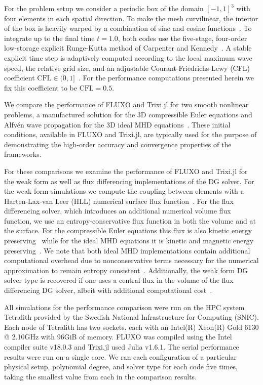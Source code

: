 \documentclass{juliacon}
\newcommand{\trixi}{Trixi.jl\xspace}
\begin{document}
For the problem setup we consider a periodic box of the domain $[-1,1]^3$ with four elements in each
spatial direction. To make the mesh curvilinear, the interior of the box is heavily warped
by a combination of sine and cosine functions~\cite{chan2019efficient}. To integrate up to the
final time $t=1.0$, both codes use the five-stage, four-order low-storage explicit
Runge-Kutta method of Carpenter and Kennedy~\cite{CarpenterKennedy1994}.
A stable explicit time step is adaptively computed according to the local maximum wave
speed, the relative grid size, and an adjustable Courant-Friedrichs-Lewy (CFL)
coefficient $\text{CFL}\in(0,1]$~\cite{gassner2011}. For the performance computations presented herein
we fix this coefficient to be $\text{CFL}=0.5$.

We compare the performance of FLUXO and \trixi for two smooth nonlinear problems,
a manufactured solution for the 3D compressible Euler equations and Alfv\'{e}n wave propagation for
the 3D ideal MHD equations~\cite{gassner2009,altmann2012}. These initial conditions, available in FLUXO and
\trixi, are typically used for the purpose of demonstrating the high-order accuracy and convergence properties
of the frameworks.

For these comparisons we examine the performance of FLUXO and \trixi for the weak
form as well as flux differencing implementations of the DG solver. For the weak form simulations we compute
the coupling between elements with a Harten-Lax-van Leer (HLL) numerical surface flux function~\cite{Toro2009,li2005hllc}.
For the flux differencing solver, which introduces an additional numerical volume flux function, we use an entropy-conservative flux
function in both the volume and at the surface. For the compressible Euler equations
this flux is also kinetic energy preserving~\cite{ranocha2020icosahom, ranocha2018thesis}
while for the ideal MHD equations it is kinetic and magnetic energy preserving~\cite{hindenlang2019}. We note that both ideal MHD implementations
contain additional computational overhead due to nonconservative terms necessary for the numerical approximation
to remain entropy consistent~\cite{bohm2020}. Additionally, the weak form DG solver type is recovered if one uses a central flux
in the volume of the flux differencing DG solver, albeit with additional computational cost~\cite{gassner2016split}.

All simulations for the performance comparison were run on the HPC system Tetralith
provided by the Swedish National Infrastructure for Computing (SNIC).
Each node of Tetralith has two sockets, each with an Intel(R) Xeon(R) Gold 6130 @ 2.10GHz with 96GiB of memory.
FLUXO was compiled using the Intel compiler suite v18.0.3 and \trixi used Julia v1.6.1.
The serial performance results were run on a single core.
We ran each configuration of a particular physical setup, polynomial degree, and solver type
for each code five times, taking the smallest value from each in the comparison results.
\end{document}

